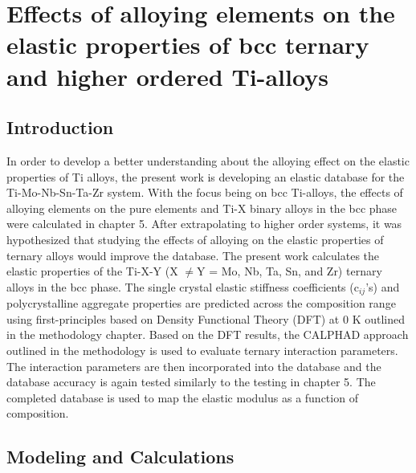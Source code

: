 \chapter{Effects of alloying elements on the elastic properties of bcc ternary and higher ordered Ti-alloys}

\section{Introduction}

In order to develop a better understanding about the alloying effect on the elastic properties of Ti alloys, the present work is developing an elastic database for the Ti-Mo-Nb-Sn-Ta-Zr system. With the focus being on bcc Ti-alloys, the effects of alloying elements on the pure elements and Ti-X binary alloys in the bcc phase were calculated in chapter 5. After extrapolating to higher order systems, it was hypothesized that studying the effects of alloying on the elastic properties of ternary alloys would improve the database. The present work calculates the elastic properties of the Ti-X-Y (X $\neq$Y = Mo, Nb, Ta, Sn, and Zr) ternary alloys in the bcc phase. The single crystal elastic stiffness coefficients (c$_{ij}$'s) and polycrystalline aggregate properties are predicted across the composition range using first-principles based on Density Functional Theory (DFT) at 0 K outlined in the methodology chapter. Based on the DFT results, the CALPHAD approach outlined in the methodology is used to evaluate ternary interaction parameters. The interaction parameters are then incorporated into the database and the database accuracy is again tested similarly to the testing in chapter 5. The completed database is used to map the elastic modulus as a function of composition.

\section{Modeling and Calculations}

